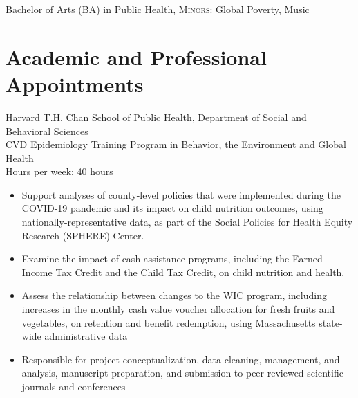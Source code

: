 \documentclass{cv_style}
\begin{document}
\parskip -4pt \noindent  Bachelor of Arts (BA) in Public Health, \textsc{Minors:} Global Poverty, Music


\parskip -5pt 
\section{Academic and Professional Appointments}
\parskip -5pt
\parskip -4pt \noindent Harvard T.H. Chan School of Public Health, Department of Social and Behavioral Sciences \\
CVD Epidemiology Training Program in Behavior, the Environment and Global Health \\
Hours per week: 40 hours
\begin{itemize}
    \item Support analyses of county-level policies that were implemented during the COVID-19 pandemic and its impact on child nutrition outcomes, using nationally-representative data, as part of the Social Policies for Health Equity Research (SPHERE) Center. \parskip 1pt
    \item Examine the impact of cash assistance programs, including the Earned Income Tax Credit and the Child Tax Credit, on child nutrition and health. \parskip 1pt
    \item Assess the relationship between changes to the WIC program, including increases in the monthly cash value voucher allocation for fresh fruits and vegetables, on retention and benefit redemption, using Massachusetts state-wide administrative data \parskip 1pt
    \item Responsible for project conceptualization, data cleaning, management, and analysis, manuscript preparation, and submission to peer-reviewed scientific journals and conferences \parskip 3pt
\end{itemize}




\parskip -5pt 
\nocite{*}
\printbibliography[title=Publications]

\vspace{2em}
\end{document}
